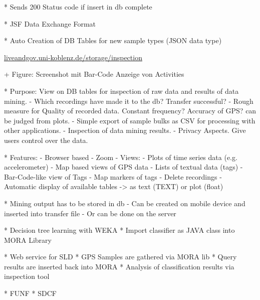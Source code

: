 \documentclass[times, 10pt,twocolumn]{article}
\begin{document}
* Sends 200 Status code if insert in db complete

* JSF Data Exchange Format

* Auto Creation of DB Tables for new sample types (JSON data type)

\url{liveandgov.uni-koblenz.de/storage/inspection}

+ Figure: Screenshot mit Bar-Code Anzeige von Activities

* Purpose: View on DB tables for inspection of raw data
  and results of data mining.
  - Which recordings have made it to the db? Transfer successful?
  - Rough measure for Quality of recorded data. Constant frequency? Accuracy of GPS? can be judged from plots.
  - Simple export of sample bulks as CSV for processing with other applications.
  - Inspection of data mining results.
  - Privacy Aspects. Give users control over the data.

* Features:
  - Browser based
  - Zoom
  - Views:
    - Plots of time series data (e.g. accelerometer)
    - Map based views of GPS data
    - Lists of textual data (tags)
    - Bar-Code-like view of Tags
    - Map markers of tags
  - Delete recordings
  - Automatic display of available tables
    -> as text (TEXT) or plot (float)

* Mining output has to be stored in db
  - Can be created on mobile device and inserted into transfer file
  - Or can be done on the server


* Decision tree learning with WEKA
* Import classifier as JAVA class into MORA Library

* Web service for SLD
* GPS Samples are gathered via MORA lib
* Query results are inserted back into MORA
* Analysis of classification results via inspection tool


* FUNF
* SDCF


\nocite{ex1,ex2}


\end{document}
